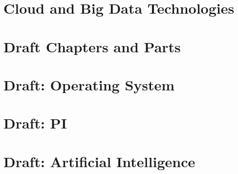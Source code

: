\documentclass{format/laszewski}
\begin{document}



\part{Cloud and Big Data Technologies}













\part{Draft Chapters and Parts}





\part{Draft: Operating System}


\part{Draft: PI}







\part{Draft: Artificial Intelligence}

% 


\begin{comment}






\end{comment}
\end{document}
